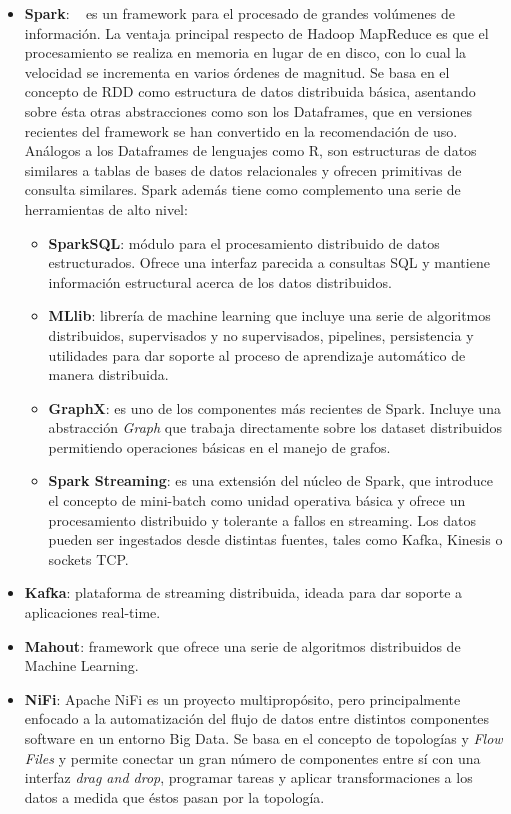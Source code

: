 \begin{itemize}
\item \textbf{Spark}: ~\cite{SPARK} es un framework para el procesado de grandes volúmenes de
  información. La ventaja principal respecto de Hadoop MapReduce es que el
  procesamiento se realiza en memoria en lugar de en disco, con lo cual la
  velocidad se incrementa en varios órdenes de magnitud. Se basa en el concepto
  de \acf{RDD} como estructura de datos distribuida básica, asentando sobre ésta
  otras abstracciones como son los Dataframes, que en versiones recientes del
  framework se han convertido en la recomendación de uso. Análogos a los
  Dataframes de lenguajes como R, son estructuras de datos similares a tablas de
  bases de datos relacionales y ofrecen primitivas de consulta similares. Spark
  además tiene como complemento una serie de
  herramientas de alto nivel:
  \begin{itemize}
  \item \textbf{SparkSQL}: módulo para el procesamiento distribuido de datos
    estructurados. Ofrece una interfaz parecida a consultas SQL y mantiene
    información estructural acerca de los datos distribuidos. 
  \item \textbf{MLlib}: librería de machine learning que incluye una serie de
    algoritmos distribuidos, supervisados y no supervisados, pipelines,
    persistencia y utilidades para dar soporte al proceso de aprendizaje
    automático de manera distribuida. 
  \item \textbf{GraphX}: es uno de los componentes más recientes de
    Spark. Incluye una abstracción \textit{Graph} que trabaja directamente sobre los
    dataset distribuidos permitiendo operaciones básicas en el manejo de
    grafos.
  \item \textbf{Spark Streaming}: es una extensión del núcleo de Spark, que
    introduce el concepto de mini-batch como unidad operativa básica y ofrece un
    procesamiento distribuido y tolerante a fallos en streaming. Los datos
    pueden ser ingestados desde distintas fuentes, tales como Kafka, Kinesis o
    sockets TCP. 
  \end{itemize}
\item \textbf{Kafka}: plataforma de streaming distribuida, ideada para dar
  soporte a aplicaciones real-time. 
\item \textbf{Mahout}: framework que ofrece una serie de algoritmos distribuidos
  de Machine Learning. 
\item \textbf{NiFi}: Apache NiFi \cite{NIFI} es un proyecto multipropósito, pero
  principalmente enfocado a la automatización del flujo de datos entre distintos
  componentes software en un entorno Big Data. Se basa en el concepto de
  topologías y 
  \textit{Flow Files} y permite conectar un gran número de componentes entre sí
  con una interfaz \textit{drag and drop},
  programar tareas y aplicar transformaciones a los datos a medida que éstos
  pasan por la topología. 
\end{itemize}

